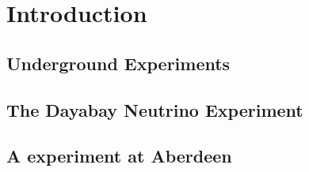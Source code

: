 
\chapter{Introduction}

\section{Underground Experiments}

\section{The Dayabay Neutrino Experiment}

\section{A experiment at Aberdeen}

